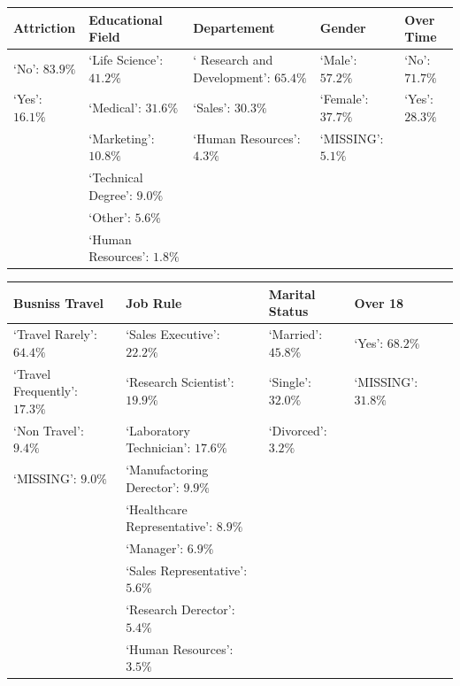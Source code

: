 \documentclass[a4paper,9pt]{article}
\begin{document}
\begin{center}
\begin{tabular}{lllll}
\toprule
\bfseries Attriction &\bfseries  Educational Field & \bfseries Departement &\bfseries  Gender & \bfseries Over Time\\
\hline
\hline
\rowcolor[gray]{0.9}
`No': $83.9\%$ &`Life Science': $41.2\%$ &` Research and Development': $65.4\%$ & `Male': $57.2\%$ & `No': $71.7\%$ \\
`Yes': $16.1\%$ &`Medical': $31.6\%$ &`Sales': $30.3\%$ & `Female': $37.7\%$ & `Yes': $28.3\%$ \\
\rowcolor[gray]{0.9}
                          &`Marketing': $10.8\%$ &`Human Resources': $4.3\%$ & `MISSING': $5.1\%$ &  \\
                          &`Technical Degree': $9.0\%$ &                                   &                                 &  \\
\rowcolor[gray]{0.9}
                          &`Other': $5.6\%$ &                                   &                                 &  \\
                          &`Human Resources': $1.8\%$ &                                   &                                 &  \\
\end{tabular}
\begin{tabular}{lllll}
\toprule
\bfseries Busniss Travel &\bfseries  Job Rule& \bfseries Marital Status &\bfseries  Over 18 & \\
\hline
\hline
\rowcolor[gray]{0.9}
`Travel Rarely': $64.4\%$ &`Sales Executive': $22.2\%$ &`Married': $45.8\%$ & `Yes': $68.2\%$ &\\
`Travel Frequently': $17.3\%$ &`Research Scientist': $19.9\%$ &`Single': $32.0\%$ & `MISSING': $31.8\%$ &\\
\rowcolor[gray]{0.9}
`Non Travel': $9.4\%$ &`Laboratory Technician': $17.6\%$ &`Divorced': $3.2\%$ &       &      \\
`MISSING': $9.0\%$ &`Manufactoring Derector': $9.9\%$ &     &       &      \\
\rowcolor[gray]{0.9}
                               &`Healthcare Representative': $8.9\%$ &     &       &      \\
                               &`Manager': $6.9\%$ &     &       &      \\
\rowcolor[gray]{0.9}
                               &`Sales Representative': $5.6\%$ &     &       &      \\
                               &`Research Derector': $5.4\%$ &     &       &      \\
\rowcolor[gray]{0.9}
                               &`Human Resources': $3.5\%$ &     &       &      \\
\bottomrule
\end{tabular}
\end{center}
\end{document}
